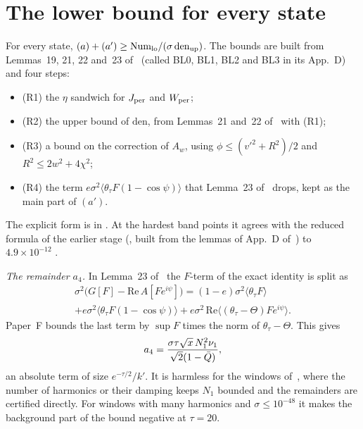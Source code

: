 \section{The lower bound for every state}
\label{sec:lemmaR}

\begin{lemma}[Lemma R] \proofst
\label{lem:R}
For every state, $(a)+(a')\ge\mathrm{Num}_{\rm lo}/(\sigma\,\mathrm{den}_{\rm up})$.
The bounds are built from Lemmas~19, 21, 22 and~23 of~\cite{F} (called BL0, BL1, BL2 and BL3 in its App.~D) and four steps:
\begin{itemize}
\item (R1) the $\eta$ sandwich for $J_{\rm per}$ and $W_{\rm per}$;
\item (R2) the upper bound of $\mathrm{den}$, from Lemmas~21 and~22 of~\cite{F} with (R1);
\item (R3) a bound on the correction of $A_w$, using $\phi\le(v'^2+R^2)/2$ and $R^2\le2w^2+4\chi^2$;
\item (R4) the term $e\sigma^2\langle\theta_\tau F(1-\cos\psi)\rangle$ that Lemma~23 of~\cite{F} drops, kept as the main part of $(a')$.
\end{itemize}
\end{lemma}
The explicit form is in .
At the hardest band points it agrees with the reduced formula of the earlier stage (, built from the lemmas of App.~D of~\cite{F}) to $4.9\times10^{-12}$ \numst.

\emph{The remainder $a_4$.}
In Lemma~23 of~\cite{F} the $F$-term of the exact identity is split as
\begin{multline}
\sigma^2\bigl(G[F]-\mathrm{Re}\,A[Fe^{i\psi}]\bigr)
=(1-e)\sigma^2\langle\theta_\tau F\rangle\\
+e\sigma^2\langle\theta_\tau F(1-\cos\psi)\rangle
+e\sigma^2\,\mathrm{Re}\langle(\theta_\tau-\Theta)Fe^{i\psi}\rangle .
\end{multline}
Paper~F bounds the last term by $\sup F$ times the norm of $\theta_\tau-\Theta$.
This gives
\begin{equation}
a_4=\frac{\sigma\tau\sqrt x\,N_1^2\nu_1}{\sqrt2(1-\bar Q)},
\end{equation}
an absolute term of size $e^{-\tau/2}/k'$.
It is harmless for the windows of~\cite{F}, where the number of harmonics or their damping keeps $N_1$ bounded and the remainders are certified directly.
For windows with many harmonics and $\sigma\le10^{-48}$ it makes the background part of the bound negative at $\tau=20$.

